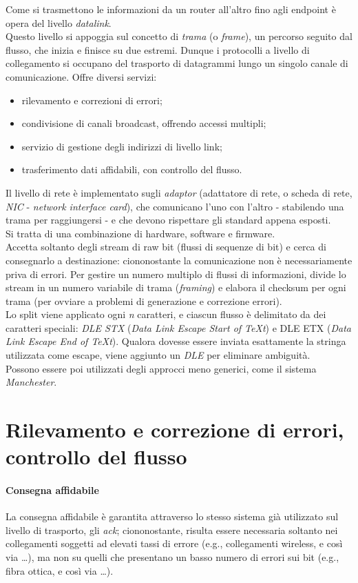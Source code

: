 Come si trasmettono le informazioni da un router all'altro fino agli endpoint è opera del livello \textit{datalink}. \\
Questo livello si appoggia sul concetto di \textit{trama} (o \textit{frame}), un percorso seguito dal flusso, che inizia e finisce su due estremi. Dunque i protocolli a livello di collegamento si occupano del trasporto di datagrammi lungo un singolo canale di comunicazione. Offre diversi servizi:
\begin{itemize}
	\item rilevamento e correzioni di errori;
	\item condivisione di canali broadcast, offrendo accessi multipli;
	\item servizio di gestione degli indirizzi di livello link;
	\item trasferimento dati affidabili, con controllo del flusso.
\end{itemize}
Il livello di rete è implementato sugli \textit{adaptor} (adattatore di rete, o scheda di rete, \textit{NIC} - \textit{network interface card}), che comunicano l'uno con l'altro - stabilendo una trama per raggiungersi - e che devono rispettare gli standard appena esposti. \\
Si tratta di una combinazione di hardware, software e firmware. \\
Accetta soltanto degli stream di raw bit (flussi di sequenze di bit) e cerca di consegnarlo a destinazione: ciononostante la comunicazione non è necessariamente priva di errori. Per gestire un numero multiplo di flussi di informazioni, divide lo stream in un numero variabile di trama (\textit{framing}) e elabora il checksum per ogni trama (per ovviare a problemi di generazione e correzione errori). \\
Lo split viene applicato ogni \textit{n} caratteri, e ciascun flusso è delimitato da dei caratteri speciali: \textit{DLE STX} (\textit{Data Link Escape Start of TeXt}) e DLE ETX (\textit{Data Link Escape End of TeXt}). Qualora dovesse essere inviata esattamente la stringa utilizzata come escape, viene aggiunto un \textit{DLE} per eliminare ambiguità. \\
Possono essere poi utilizzati degli approcci meno generici, come il sistema \textit{Manchester}.

\section{Rilevamento e correzione di errori, controllo del flusso}
\paragraph{Consegna affidabile}
La consegna affidabile è garantita attraverso lo stesso sistema già utilizzato sul livello di trasporto, gli \textit{ack}; ciononostante, risulta essere necessaria soltanto nei collegamenti soggetti ad elevati tassi di errore (e.g., collegamenti wireless, e così via \ldots), ma non su quelli che presentano un basso numero di errori sui bit (e.g., fibra ottica, e così via \ldots).
